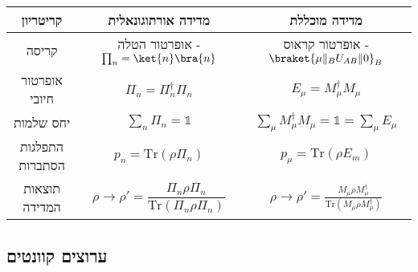 \documentclass{tstextbook}
\begin{document}
\begin{summary}
  \begin{table}[htbp]
    \centering
    \begin{tabular}{|ccc|}
      \hline
      קריטריון & מדידה אורתוגונאלית & מדידה מוכללת \\ \hline
      קריסה & אופרטור הטלה - \(\prod_{n}=\ket{n}\bra{n}\) & אופרטור קראוס - \(\braket{ \mu \| _{B} U_{AB}\|0 }_{B}\) \\ \hline
      אופרטור חיובי & \(\Pi_{n}=\Pi_{n}^{\dagger}\Pi_{n}\) & \(E_{\mu}=M_{\mu}^{\dagger}M_{\mu}\) \\ \hline
      יחס שלמות & \(\sum_{n}\Pi_{n}=\mathbb{1}\) & \(\sum_{\mu} M_{\mu}^{\dagger}M_{\mu}=\mathbb{1}=\sum_{\mu}E_{\mu}\) \\ \hline
      התפלגות הסתברות & \(p_{n}=\mathrm{Tr}\left( \rho \Pi_{n} \right)\) & \(p_{\mu}=\mathrm{Tr}\left( \rho E_{m} \right)\) \\ \hline
      תוצאות המדידה & $$\rho\to \rho' = \frac{\Pi_{n}\rho \Pi_{n}}{\mathrm{Tr}\left( \Pi_{n}\rho \Pi_{n} \right)}$$ & \(\rho\to \rho' = \frac{M_{\mu}\rho M_{\mu}^{\dagger}}{\mathrm{Tr}\left( M_{\mu}\rho M_{\mu}^{\dagger} \right)}\) \\ \hline
    \end{tabular}
  \end{table}
\end{summary}
\subsection{ערוצים קוונטים}
\end{document}
